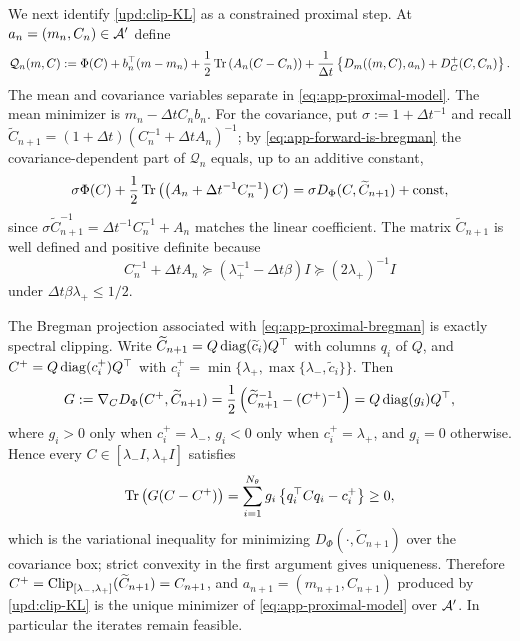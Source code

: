 We next identify \eqref{upd:clip-KL} as a constrained proximal step. At $a_n = (m_n, C_n) \in \mathcal{A}'$ define
\begin{equation}\label{eq:app-proximal-model}
    \mathcal{Q}_n (m, C) := \Phi (C) + b_n^\top (m - m_n) + \frac{1}{2} \operatorname{Tr} \left( A_n (C - C_n) \right) + \frac{1}{\Delta t} \left\{ D_m ((m, C), a_n) + D_C^+ (C, C_n) \right\}.
\end{equation}
The mean and covariance variables separate in \eqref{eq:app-proximal-model}. The mean minimizer is $m_n - \Delta t C_n b_n$. For the covariance, put $\sigma := 1 + \Delta t^{-1}$ and recall $\widetilde{C}_{n+1} = (1 + \Delta t) (C_n^{-1} + \Delta t A_n)^{-1}$; by \eqref{eq:app-forward-is-bregman} the covariance-dependent part of $\mathcal{Q}_n$ equals, up to an additive constant,
\begin{equation}\label{eq:app-proximal-bregman}
    \sigma \Phi (C) + \frac{1}{2} \operatorname{Tr} \left( \left( A_n + \Delta t^{-1} C_n^{-1} \right) C \right) = \sigma D_\Phi (C, \widetilde{C}_{n+1}) + \mathrm{const},
\end{equation}
since $\sigma \widetilde{C}_{n+1}^{-1} = \Delta t^{-1} C_n^{-1} + A_n$ matches the linear coefficient. The matrix $\widetilde{C}_{n+1}$ is well defined and positive definite because
\begin{equation*}
    C_n^{-1} + \Delta t A_n \succeq (\lambda_+^{-1} - \Delta t \beta) I \succeq (2 \lambda_+)^{-1} I
\end{equation*}
under $\Delta t \beta \lambda_+ \leq 1/2$.

The Bregman projection associated with \eqref{eq:app-proximal-bregman} is exactly spectral clipping. Write $\widetilde{C}_{n+1} = Q \operatorname{diag} (\widetilde{c}_i) Q^\top$ with columns $q_i$ of $Q$, and $C^+ = Q \operatorname{diag} (c_i^+) Q^\top$ with $c_i^+ = \min \{ \lambda_+, \max \{ \lambda_-, \widetilde{c}_i \} \}$. Then
\begin{equation*}
    G := \nabla_C D_\Phi (C^+, \widetilde{C}_{n+1}) = \frac{1}{2} \left( \widetilde{C}_{n+1}^{-1} - (C^+)^{-1} \right) = Q \operatorname{diag} (g_i) Q^\top,
\end{equation*}
where $g_i > 0$ only when $c_i^+ = \lambda_-$, $g_i < 0$ only when $c_i^+ = \lambda_+$, and $g_i = 0$ otherwise. Hence every $C \in [\lambda_- I, \lambda_+ I]$ satisfies
\begin{equation*}
    \operatorname{Tr} \left( G (C - C^+) \right) = \sum_{i=1}^{N_\theta} g_i \left\{ q_i^\top C q_i - c_i^+ \right\} \geq 0,
\end{equation*}
which is the variational inequality for minimizing $D_\Phi (\cdot, \widetilde{C}_{n+1})$ over the covariance box; strict convexity in the first argument gives uniqueness. Therefore $C^+ = \operatorname{Clip}_{[\lambda_-, \lambda_+]} (\widetilde{C}_{n+1}) = C_{n+1}$, and $a_{n+1} = (m_{n+1}, C_{n+1})$ produced by \eqref{upd:clip-KL} is the unique minimizer of \eqref{eq:app-proximal-model} over $\mathcal{A}'$. In particular the iterates remain feasible.

